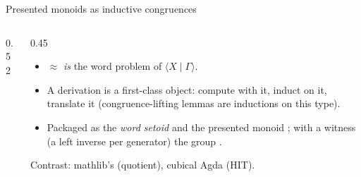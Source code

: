 \begin{frame}{Presented monoids as inductive congruences \InPaper}
\begin{columns}[c]
\begin{column}{0.52\textwidth}
\begin{code}
\AgdaSymbol{)}\AgdaSpace{}%
\AgdaSpace{}%
\AgdaSpace{}%
\AgdaSpace{}%
\AgdaSpace{}%
\AgdaSpace{}%
\AgdaSymbol{(}\AgdaSpace{}%
\AgdaSpace{}%
\AgdaSymbol{)}\<%
\\
%
\>[2]%
\>[13]\AgdaSymbol{:}\AgdaSpace{}%
\AgdaSpace{}%
\AgdaSpace{}%
\AgdaSpace{}%
\AgdaSpace{}%
\<%
\\
%
\>[2]\AgdaSpace{}%
\AgdaSymbol{:}\AgdaSpace{}%
\AgdaSpace{}%
\AgdaSpace{}%
\AgdaSpace{}%
\AgdaSpace{}%
\<%
\\
%
\>[2]%
\>[13]\AgdaSymbol{:}\AgdaSpace{}%
\AgdaSpace{}%
\AgdaOperator{\AgdaPostulate{===}}\AgdaSpace{}%
\AgdaSpace{}%
\AgdaSpace{}%
\AgdaSpace{}%
\AgdaSpace{}%
\<%
\end{code}
\end{column}
\begin{column}{0.45\textwidth}
\begin{itemize}
  \setlength{\itemsep}{4pt}
  \item $\approx$ \emph{is} the word problem of $\langle X\mid\Gamma\rangle$.
  \item A derivation is a \alert{first-class object}: compute with it,
        induct on it, translate it (congruence-lifting lemmas are inductions
        on this type).
  \item Packaged as the \emph{word setoid} and the presented monoid
        ; with a  witness (a left inverse per
        generator) the group .
\end{itemize}
\vspace{2pt}
{\small Contrast: mathlib's  (quotient), cubical Agda (HIT).}
\end{column}
\end{columns}
\end{frame}

